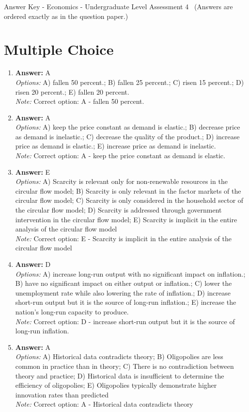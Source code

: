 \documentclass[12pt]{article}
\begin{document}
\begin{center}
Answer Key - Economics - Undergraduate Level Assessment 4 \
\small (Answers are ordered exactly as in the question paper.)
\end{center}

\section*{Multiple Choice}
\begin{enumerate}[label=\arabic*.]
\item \textbf{Answer:} A
\\ \textit{Options:} A) fallen 50 percent.; B) fallen 25 percent.; C) risen 15 percent.; D) risen 20 percent.; E) fallen 20 percent.
\\ \textit{Note:} Correct option: A - fallen 50 percent.
\item \textbf{Answer:} A
\\ \textit{Options:} A) keep the price constant as demand is elastic.; B) decrease price as demand is inelastic.; C) decrease the quality of the product.; D) increase price as demand is elastic.; E) increase price as demand is inelastic.
\\ \textit{Note:} Correct option: A - keep the price constant as demand is elastic.
\item \textbf{Answer:} E
\\ \textit{Options:} A) Scarcity is relevant only for non-renewable resources in the circular flow model; B) Scarcity is only relevant in the factor markets of the circular flow model; C) Scarcity is only considered in the household sector of the circular flow model; D) Scarcity is addressed through government intervention in the circular flow model; E) Scarcity is implicit in the entire analysis of the circular flow model
\\ \textit{Note:} Correct option: E - Scarcity is implicit in the entire analysis of the circular flow model
\item \textbf{Answer:} D
\\ \textit{Options:} A) increase long-run output with no significant impact on inflation.; B) have no significant impact on either output or inflation.; C) lower the unemployment rate while also lowering the rate of inflation.; D) increase short-run output but it is the source of long-run inflation.; E) increase the nation's long-run capacity to produce.
\\ \textit{Note:} Correct option: D - increase short-run output but it is the source of long-run inflation.
\item \textbf{Answer:} A
\\ \textit{Options:} A) Historical data contradicts theory; B) Oligopolies are less common in practice than in theory; C) There is no contradiction between theory and practice; D) Historical data is insufficient to determine the efficiency of oligopolies; E) Oligopolies typically demonstrate higher innovation rates than predicted
\\ \textit{Note:} Correct option: A - Historical data contradicts theory
\end{enumerate}
\end{document}
